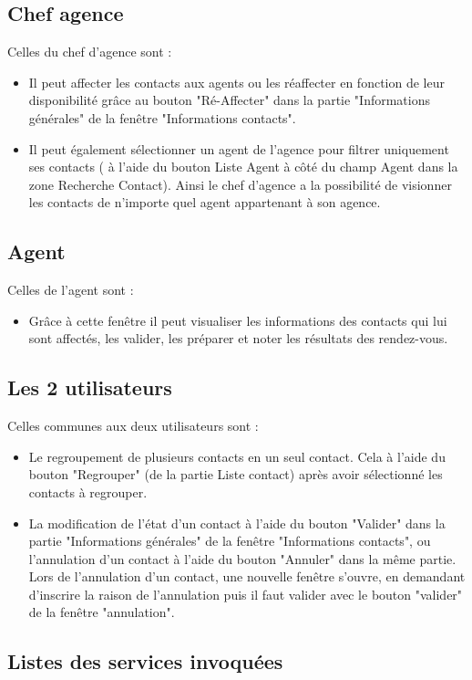        \subsection{Chef agence}
              Celles du chef d'agence sont :
              \begin{itemize}
                  \item Il peut affecter les contacts aux agents ou les réaffecter en fonction de leur disponibilité grâce au bouton "Ré-Affecter" dans la partie "Informations générales" de la fenêtre "Informations contacts".
                  \item Il peut également sélectionner un agent de l'agence pour filtrer uniquement ses contacts ( à l'aide du bouton Liste Agent à côté du champ Agent dans la zone Recherche Contact). Ainsi le chef d’agence a la possibilité de visionner les contacts de n’importe quel agent appartenant à son agence.
              \end{itemize}

       \subsection{Agent}
              Celles de l'agent sont :
              \begin{itemize}
                  \item Grâce à cette fenêtre il peut visualiser les informations des contacts qui lui sont affectés, les valider, les préparer et noter les résultats des rendez-vous.
              \end{itemize}

       \subsection{Les 2 utilisateurs}
              Celles communes aux deux utilisateurs sont :
              \begin{itemize}
                  \item Le regroupement de plusieurs contacts en un seul contact. Cela à l'aide du bouton "Regrouper" (de la partie Liste contact) après avoir sélectionné les contacts à regrouper.
                  \item La modification de l'état d'un contact à l'aide du bouton "Valider" dans la partie "Informations générales" de la fenêtre "Informations contacts", ou l'annulation d'un contact à l'aide du bouton "Annuler" dans la même partie. Lors de l'annulation d'un contact, une nouvelle fenêtre s'ouvre, en demandant d'inscrire la raison de l'annulation puis il faut valider avec le bouton "valider" de la fenêtre "annulation".
              \end{itemize}


       \subsection{Listes des services invoquées}








